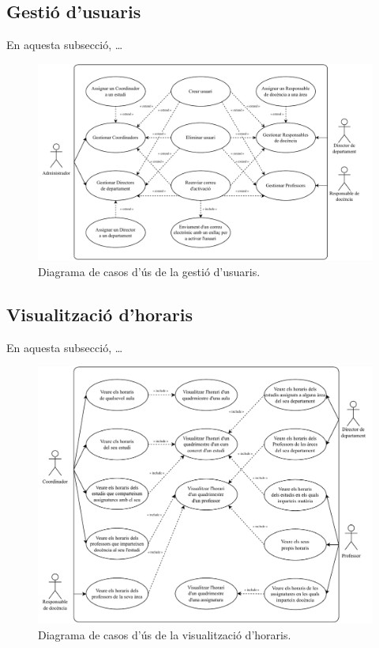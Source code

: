 \documentclass[a4paper,12pt]{ThesisStyle}
\begin{document}
\subsection{Gestió d'usuaris}
\label{subsec:casos_us_usuaris}

En aquesta subsecció, \dots

\begin{figure}[H]
  \centering
  \includegraphics[width=\textwidth]{assets/use_cases/usuaris.pdf}
  \caption{\label{img:casos_us_usuaris}Diagrama de casos d'ús de la gestió d'usuaris.}
\end{figure}

\subsection{Visualització d'horaris}
\label{subsec:casos_us_c}

En aquesta subsecció, \dots

\begin{figure}[H]
  \centering
  \includegraphics[width=\textwidth]{assets/use_cases/horaris/visualitzar.pdf}
  \caption{\label{img:casos_us_horaris_visual}Diagrama de casos d'ús de la visualització d'horaris.}
\end{figure}
\end{document}
